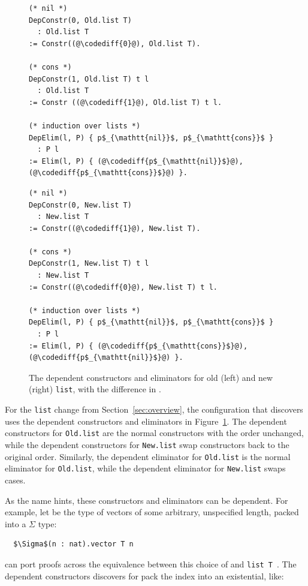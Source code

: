 \begin{figure}
\begin{minipage}{0.49\textwidth}
\begin{lstlisting}
(* nil *)
DepConstr(0, Old.list T)
  : Old.list T
:= Constr((@\codediff{0}@), Old.list T).

(* cons *)
DepConstr(1, Old.list T) t l
  : Old.list T
:= Constr ((@\codediff{1}@), Old.list T) t l.

(* induction over lists *)
DepElim(l, P) { p$_{\mathtt{nil}}$, p$_{\mathtt{cons}}$ }
  : P l
:= Elim(l, P) { (@\codediff{p$_{\mathtt{nil}}$}@), (@\codediff{p$_{\mathtt{cons}}$}@) }.
\end{lstlisting}
\end{minipage}
\hfill
\begin{minipage}{0.49\textwidth}
\begin{lstlisting}
(* nil *)
DepConstr(0, New.list T)
  : New.list T
:= Constr((@\codediff{1}@), New.list T).

(* cons *)
DepConstr(1, New.list T) t l
  : New.list T
:= Constr((@\codediff{0}@), New.list T) t l.

(* induction over lists *)
DepElim(l, P) { p$_{\mathtt{nil}}$, p$_{\mathtt{cons}}$ }
  : P l
:= Elim(l, P) { (@\codediff{p$_{\mathtt{cons}}$}@), (@\codediff{p$_{\mathtt{nil}}$}@) }.
\end{lstlisting}
\end{minipage}
\caption{The dependent constructors and eliminators for old (left) and new (right) \lstinline{list}, with the difference in .}
\label{fig:listconfig}
\end{figure}

For the \lstinline{list} change from Section~\ref{sec:overview},
the configuration that \toolnamec discovers uses the dependent constructors
and eliminators in Figure~\ref{fig:listconfig}. The dependent constructors for \lstinline{Old.list}
are the normal constructors with the order unchanged,
while the dependent constructors for \lstinline{New.list} swap constructors
back to the original order.
Similarly, the dependent eliminator for \lstinline{Old.list} is the normal eliminator for \lstinline{Old.list},
while the dependent eliminator for \lstinline{New.list} swaps cases.

As the name hints, these constructors and eliminators can be dependent.
For example, let \B be the type of
vectors of some arbitrary, unspecified length,
packed into a $\Sigma$ type:

\begin{lstlisting}
  $\Sigma$(n : nat).vector T n
\end{lstlisting}
\toolnamec can port proofs across the equivalence between this choice of \B and \lstinline{list T}~\href{https://github.com/uwplse/pumpkin-pi/blob/v2.0.0/plugin/coq/examples/Example.v}{}. %
The dependent constructors \toolnamec discovers for \B pack the index into an existential, like:

